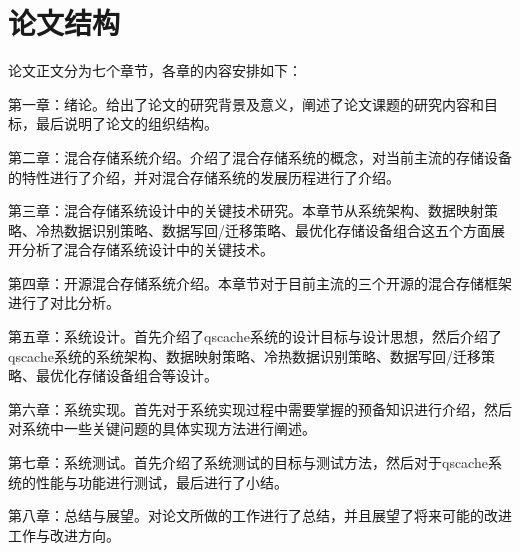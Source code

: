 \section{论文结构}

论文正文分为七个章节，各章的内容安排如下： 

第一章：绪论。给出了论文的研究背景及意义，阐述了论文课题的研究内容和目标，最后说明了论文的组织结构。 

第二章：混合存储系统介绍。介绍了混合存储系统的概念，对当前主流的存储设备的特性进行了介绍，并对混合存储系统的发展历程进行了介绍。 

第三章：混合存储系统设计中的关键技术研究。本章节从系统架构、数据映射策略、冷热数据识别策略、数据写回/迁移策略、最优化存储设备组合这五个方面展开分析了混合存储系统设计中的关键技术。 

第四章：开源混合存储系统介绍。本章节对于目前主流的三个开源的混合存储框架进行了对比分析。

第五章：系统设计。首先介绍了qscache系统的设计目标与设计思想，然后介绍了qscache系统的系统架构、数据映射策略、冷热数据识别策略、数据写回/迁移策略、最优化存储设备组合等设计。 

第六章：系统实现。首先对于系统实现过程中需要掌握的预备知识进行介绍，然后对系统中一些关键问题的具体实现方法进行阐述。 

第七章：系统测试。首先介绍了系统测试的目标与测试方法，然后对于qscache系统的性能与功能进行测试，最后进行了小结。 

第八章：总结与展望。对论文所做的工作进行了总结，并且展望了将来可能的改进工作与改进方向。

